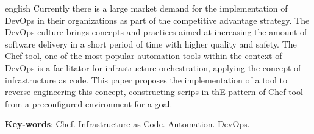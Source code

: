 \newpage
\begin{resumo}[Abstract]
  \begin{otherlanguage*}{english}
    Currently there is a large market demand for the implementation
    of DevOps in their organizations as part of the competitive advantage
    strategy. The DevOps culture brings concepts and practices aimed at increasing
    the amount of software delivery in a short period of time with higher quality
    and safety. The Chef tool, one of the most popular automation tools within the
    context of DevOps is a facilitator for infrastructure orchestration, applying
    the concept of infrastructure as code. This paper proposes the implementation
    of a tool to reverse engineering this concept, constructing scrips in thE
    pattern of Chef tool from a preconfigured environment for a goal.

    \vspace{\onelineskip}
    \noindent 
    \textbf{Key-words}: Chef. Infrastructure as Code. Automation. DevOps.
  \end{otherlanguage*}
\end{resumo}
